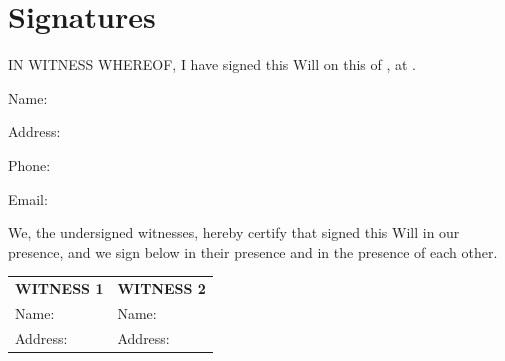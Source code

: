 
\section*{Signatures}
\label{sec:signatures}
IN WITNESS WHEREOF, I have signed this Will on this \WillDay{} of \WillMonth{}, \WillYear{} at \WillLocation{}.

\vspace{0.1in}

\hspace{3in}
Name: \TestatorName{}

\vspace{0.1in}

\hspace{3in}
\parbox{3.5in}{
Address: \TestatorAddress{}
}
\vspace{0.1in}

\hspace{3in}
Phone: \TestatorPhone{}

\vspace{0.1in}

\hspace{3in}
Email: \TestatorEmail{}

\vspace{0.3in}

\noindent We, the undersigned witnesses, hereby certify that \TestatorName{} signed this Will in our presence, and we sign below in their presence and in the presence of each other.

\vspace{0.5in}

\begin{tabular}{p{8cm} p{8cm}}
\textbf{WITNESS 1} & \textbf{WITNESS 2} \\ 
Name: \FirstWitnessName{} & Name: \SecondWitnessName{} \\ 
Address: \FirstWitnessAddress{} & Address: \SecondWitnessAddress{} \\ 
\end{tabular}

